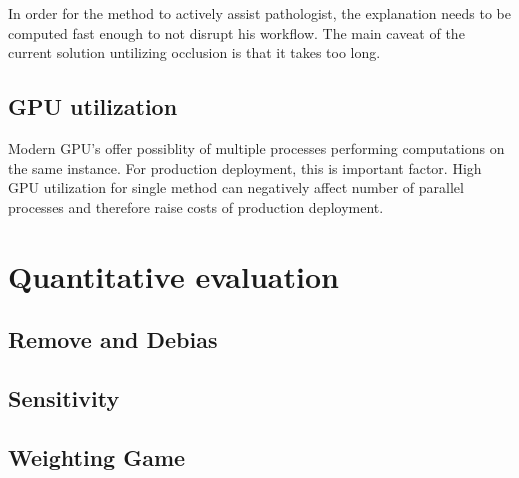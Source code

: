 In order for the method to actively assist pathologist, the explanation needs to be computed fast enough to not disrupt his workflow. The main caveat of the current solution untilizing occlusion is that it takes too long.

\subsection{GPU utilization}

Modern GPU's offer possiblity of multiple processes performing computations on the same instance. For production deployment, this is important factor. High GPU utilization for single method can negatively affect number of parallel processes and therefore raise costs of production deployment.

\section{Quantitative evaluation}

\subsection{Remove and Debias}

\subsection{Sensitivity}

\subsection{Weighting Game}
